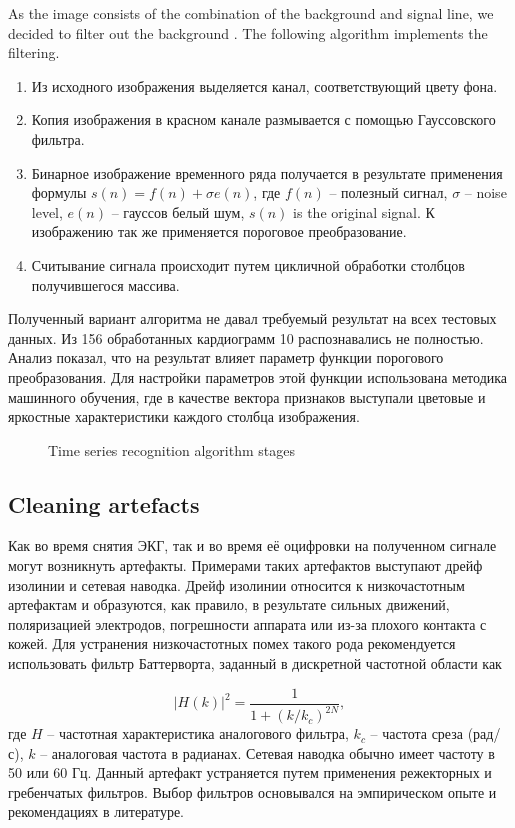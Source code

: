 \documentclass[runningheads]{AIIT}
\begin{document}
As the image consists of the combination of the background and signal line, we decided to filter out the background \cite{1}.  The following algorithm implements the filtering.
\begin{enumerate}
\item Из исходного изображения выделяется канал, соответствующий
  цвету фона.
\item Копия изображения в красном канале размывается с
  помощью Гауссовского фильтра.
\item Бинарное изображение временного
  ряда получается в результате применения формулы
  $s(n)=f(n)+\sigma e(n)$, где $f(n)$ – полезный сигнал, $\sigma$ –
  noise level, $e(n)$ – гауссов белый шум, $s(n)$ is the original
  signal.  К изображению так же применяется пороговое преобразование.
\item Считывание сигнала происходит путем цикличной обработки столбцов
  получившегося массива.
\end{enumerate}
Полученный вариант алгоритма не давал требуемый результат на всех тестовых данных. Из 156 обработанных кардиограмм 10 распознавались не полностью. Анализ показал, что на результат влияет параметр функции порогового преобразования. Для настройки параметров этой функции использована методика машинного обучения, где в качестве вектора признаков выступали цветовые и яркостные характеристики каждого столбца изображения.


\begin{figure}[htb]
  \centering

  \caption{Time series recognition algorithm stages}
  \label{fig:leads-ex}
\end{figure}

\subsection{Cleaning artefacts}
\label{sec:cleaning-artefacts}

Как во время снятия ЭКГ, так и во время её оцифровки на полученном сигнале могут возникнуть артефакты. Примерами таких артефактов выступают дрейф изолинии и сетевая наводка. Дрейф изолинии относится к низкочастотным артефактам и образуются, как правило, в результате сильных движений, поляризацией электродов, погрешности аппарата или из-за плохого контакта с кожей. Для устранения низкочастотных помех такого рода рекомендуется использовать фильтр Баттерворта, заданный в дискретной частотной области как

$$
|H(k)|^2=\frac{1}{1+(k/k_c)^{2N}},
$$
где $H$ – частотная характеристика аналогового фильтра, $k_c$  – частота среза (рад/с), $k$ – аналоговая частота в радианах.
Сетевая наводка обычно имеет частоту в 50 или 60 Гц. Данный артефакт устраняется путем применения режекторных и гребенчатых фильтров.
Выбор фильтров основывался на эмпирическом опыте и рекомендациях в литературе.
\end{document}

